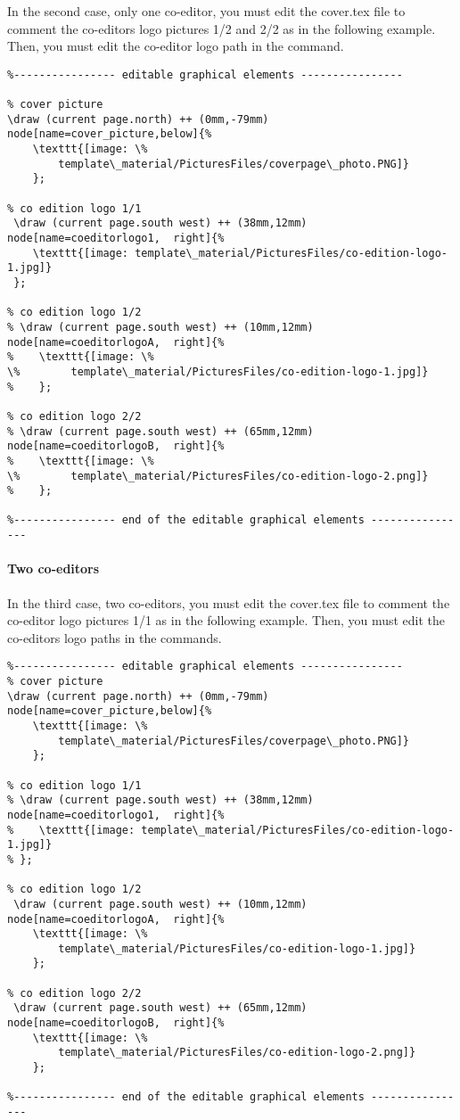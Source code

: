 \documentclass[Theme1]{{template_material/eurostat}}
\begin{document}
In the second case, only one co-editor, you must edit the cover.tex file to comment the co-editors logo pictures 1/2 and 2/2 as in the following example. Then, you must edit the co-editor logo path in the  command.
\begin{verbatim}
%---------------- editable graphical elements ----------------
    
% cover picture
\draw (current page.north) ++ (0mm,-79mm) node[name=cover_picture,below]{%
    \texttt{[image: \%
        template\_material/PicturesFiles/coverpage\_photo.PNG]}
    };

% co edition logo 1/1
 \draw (current page.south west) ++ (38mm,12mm) node[name=coeditorlogo1,  right]{%
    \texttt{[image: template\_material/PicturesFiles/co-edition-logo-1.jpg]}
 }; 
     
% co edition logo 1/2
% \draw (current page.south west) ++ (10mm,12mm) node[name=coeditorlogoA,  right]{%
%    \texttt{[image: \%
\%        template\_material/PicturesFiles/co-edition-logo-1.jpg]}
%    }; 
     
% co edition logo 2/2
% \draw (current page.south west) ++ (65mm,12mm) node[name=coeditorlogoB,  right]{%
%    \texttt{[image: \%
\%        template\_material/PicturesFiles/co-edition-logo-2.png]}
%    }; 

%---------------- end of the editable graphical elements ----------------
\end{verbatim}

\paragraph{Two co-editors}

In the third case, two co-editors, you must edit the cover.tex file to comment the co-editor logo pictures 1/1 as in the following example. Then, you must edit the co-editors logo paths in the  commands.
\begin{verbatim}
%---------------- editable graphical elements ----------------
% cover picture
\draw (current page.north) ++ (0mm,-79mm) node[name=cover_picture,below]{%
    \texttt{[image: \%
        template\_material/PicturesFiles/coverpage\_photo.PNG]}
    };

% co edition logo 1/1
% \draw (current page.south west) ++ (38mm,12mm) node[name=coeditorlogo1,  right]{%
%    \texttt{[image: template\_material/PicturesFiles/co-edition-logo-1.jpg]}
% }; 
     
% co edition logo 1/2
 \draw (current page.south west) ++ (10mm,12mm) node[name=coeditorlogoA,  right]{%
    \texttt{[image: \%
        template\_material/PicturesFiles/co-edition-logo-1.jpg]}
    }; 
     
% co edition logo 2/2
 \draw (current page.south west) ++ (65mm,12mm) node[name=coeditorlogoB,  right]{%
    \texttt{[image: \%
        template\_material/PicturesFiles/co-edition-logo-2.png]}
    }; 

%---------------- end of the editable graphical elements ----------------
\end{verbatim}
\end{document}
